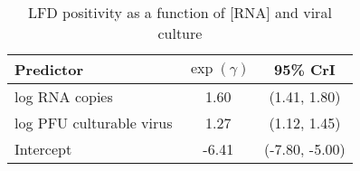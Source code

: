 \begin{appendix}
\begin{table}[p]
    \centering
    \caption{LFD positivity as a function of [RNA] and viral culture}
    \begin{tabular}{lcc}
     \toprule
     Predictor & $\exp(\gamma)$ & 95\% CrI\\
     \midrule
     log RNA copies & 1.60 & (1.41, 1.80)\\
     log PFU culturable virus & 1.27 & (1.12, 1.45)\\
     \midrule
     Intercept & -6.41 & (-7.80, -5.00)\\
     \bottomrule
     \end{tabular}
    \label{tab:lfd}
\end{table}
\end{appendix}
